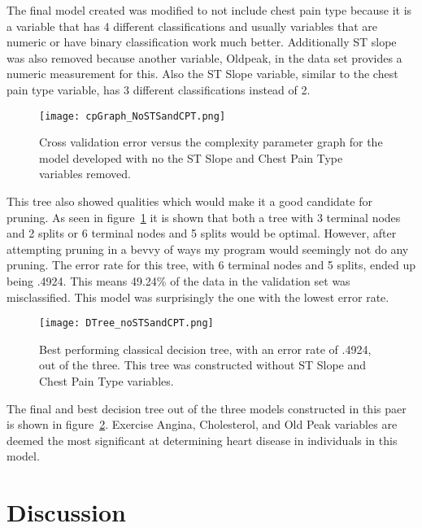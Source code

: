 \documentclass[12pt]{article}
\begin{document}
The final model created was modified to not include chest pain type because it is a variable that has 4 different classifications and usually variables that are numeric or have binary classification work much better. Additionally ST slope was also removed because another variable, Oldpeak, in the data set provides a numeric measurement for this. Also the ST Slope variable, similar to the chest pain type variable, has 3 different classifications instead of 2.
\begin{figure}[tbp]
  \centering
  \texttt{[image: cpGraph\_NoSTSandCPT.png]}
  \caption{Cross validation error versus the complexity parameter graph for the model developed with no the ST Slope and Chest Pain Type variables removed.}
  \label{fig:cpGraph_NoSTSandCPT}
\end{figure} 
This tree also showed qualities which would make it a good candidate for pruning. As seen in figure~\ref*{fig:cpGraph_NoSTSandCPT} it is shown that both a tree with 3 terminal nodes and 2 splits or 6 terminal nodes and 5 splits would be optimal. However, after attempting pruning in a bevvy of ways my program would seemingly not do any pruning. The error rate for this tree, with 6 terminal nodes and 5 splits, ended up being .4924. This means 49.24\% of the data in the validation set was misclassified. This model was surprisingly the one with the lowest error rate. \par
\begin{figure}[tbp]
  \centering
  \texttt{[image: DTree\_noSTSandCPT.png]}
  \caption{Best performing classical decision tree, with an error rate of .4924, out of the three. This tree was constructed without ST Slope and Chest Pain Type variables. }
  \label{fig:DTree_noSTSandCPT}
\end{figure} 
The final and best decision tree out of the three models constructed in this paer is shown in figure~\ref*{fig:DTree_noSTSandCPT}. Exercise Angina, Cholesterol, and Old Peak variables are deemed the most significant at determining heart disease in individuals in this model. \par
\section{Discussion}
\label{sec:disc}
\end{document}
